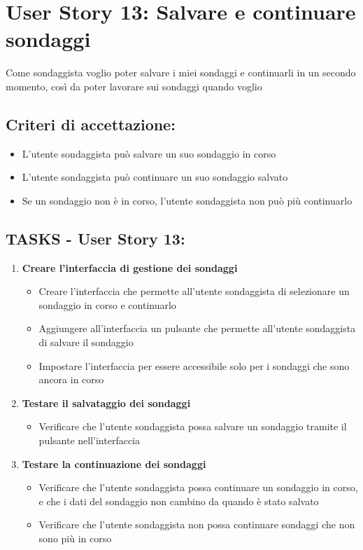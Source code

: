 \section*{User Story 13: Salvare e continuare sondaggi}
    Come sondaggista voglio poter salvare i miei sondaggi e continuarli in un secondo momento, così da poter lavorare sui sondaggi quando voglio
    \subsection*{Criteri di accettazione:}  
    \begin{itemize}  
        \item L'utente sondaggista può salvare un suo sondaggio in corso
        \item L'utente sondaggista può continuare un suo sondaggio salvato 
        \item Se un sondaggio non è in corso, l'utente sondaggista non può più continuarlo
    \end{itemize}  
    \subsection*{TASKS - User Story 13:}  
    \begin{enumerate}  
        \item \textbf{Creare l'interfaccia di gestione dei sondaggi}  
            \begin{itemize}   
                \item Creare l'interfaccia che permette all'utente sondaggista di selezionare un sondaggio in corso e continuarlo
                \item Aggiungere all'interfaccia un pulsante che permette all'utente sondaggista di salvare il sondaggio
                \item Impostare l'interfaccia per essere accessibile solo per i sondaggi che sono ancora in corso
            \end{itemize} 
        \item \textbf{Testare il salvataggio dei sondaggi}  
            \begin{itemize}  
                \item Verificare che l'utente sondaggista possa salvare un sondaggio tramite il pulsante nell'interfaccia
            \end{itemize} 
        \item \textbf{Testare la continuazione dei sondaggi}  
            \begin{itemize}  
                \item Verificare che l'utente sondaggista possa continuare un sondaggio in corso, e che i dati del sondaggio non cambino da quando è stato salvato
                \item Verificare che l'utente sondaggista non possa continuare sondaggi che non sono più in corso
            \end{itemize} 
    \end{enumerate}
